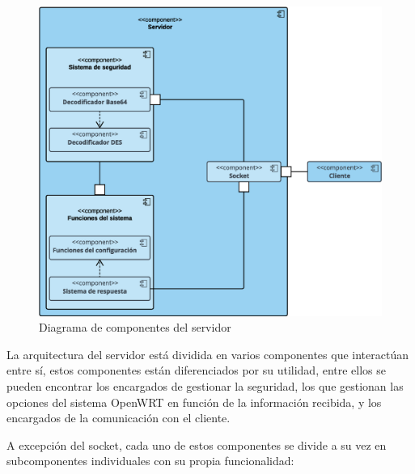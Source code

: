 \documentclass[12pt]{article}
\begin{document}
            \begin{figure}[h!]
            \centering
                \includegraphics[scale=0.4]{server_diagram.eps}
                \caption{Diagrama de componentes del servidor}
                \label{fig:server_diagram}
            \end{figure}

            La arquitectura del servidor está dividida en varios componentes que interactúan entre sí, estos componentes están diferenciados por su utilidad, entre ellos se pueden encontrar los encargados de gestionar la seguridad, los que gestionan las opciones del sistema OpenWRT en función de la información recibida, y los encargados de la comunicación con el cliente.

            A excepción del socket, cada uno de estos componentes se divide a su vez en subcomponentes individuales con su propia funcionalidad:
\end{document}
